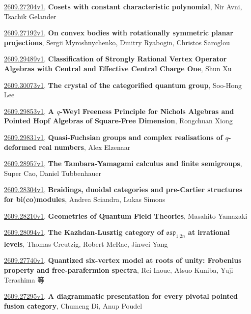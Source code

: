 \documentclass[9pt, a4paper]{article}
\theoremstyle{plain}
\theoremstyle{definition}
\theoremstyle{remark}
\newcommand{\arxiv}[3]{\href{https://arxiv.org/abs/#1}{#1}, \textbf{\textcolor{arxivblue}{#2}}, #3}
\begin{document}
\arxiv{2609.27204v1}{Cosets with constant characteristic polynomial}{Nir Avni, Tsachik Gelander}

\arxiv{2609.27192v1}{On convex bodies with rotationally symmetric planar projections}{Sergii Myroshnychenko, Dmitry Ryabogin, Christos Saroglou}

\arxiv{2609.29489v1}{Classification of Strongly Rational Vertex Operator Algebras with Central and Effective Central Charge One}{Shun Xu}

\arxiv{2609.30073v1}{The crystal of the categorified quantum group}{Soo-Hong Lee}

\arxiv{2609.29853v1}{A $q$-Weyl Freeness Principle for Nichols Algebras and Pointed Hopf Algebras of Square-Free Dimension}{Rongchuan Xiong}

\arxiv{2609.29831v1}{Quasi-Fuchsian groups and complex realisations of $q$-deformed real numbers}{Alex Elzenaar}

\arxiv{2609.28957v1}{The Tambara-Yamagami calculus and finite semigroups}{Super Cao, Daniel Tubbenhauer}

\arxiv{2609.28304v1}{Braidings, duoidal categories and pre-Cartier structures for bi(co)modules}{Andrea Sciandra, Lukas Simons}

\arxiv{2609.28210v1}{Geometries of Quantum Field Theories}{Masahito Yamazaki}

\arxiv{2609.28094v1}{The Kazhdan-Lusztig category of $\mathfrak{osp}_{1|2n}$ at irrational levels}{Thomas Creutzig, Robert McRae, Jinwei Yang}

\arxiv{2609.27740v1}{Quantized six-vertex model at roots of unity: Frobenius property and free-parafermion spectra}{Rei Inoue, Atsuo Kuniba, Yuji Terashima 等}

\arxiv{2609.27295v1}{A diagrammatic presentation for every pivotal pointed fusion category}{Chumeng Di, Anup Poudel}

\end{document}

